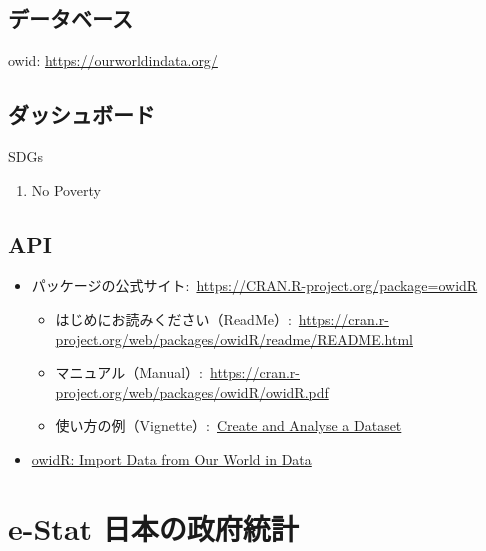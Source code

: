 \documentclass[
  xelatex, ja=standard]{bxjsbook}
\providecommand{\tightlist}{%
  \setlength{\itemsep}{0pt}\setlength{\parskip}{0pt}}
\theoremstyle{definition}
\theoremstyle{definition}
\theoremstyle{definition}
\theoremstyle{definition}
\theoremstyle{remark}
\begin{document}
\hypertarget{ux30c7ux30fcux30bfux30d9ux30fcux30b9-3}{%
\section{データベース}\label{ux30c7ux30fcux30bfux30d9ux30fcux30b9-3}}

owid: \url{https://ourworldindata.org/}

\hypertarget{ux30c0ux30c3ux30b7ux30e5ux30dcux30fcux30c9-3}{%
\section{ダッシュボード}\label{ux30c0ux30c3ux30b7ux30e5ux30dcux30fcux30c9-3}}

SDGs

\begin{enumerate}
\def\labelenumi{\arabic{enumi}.}
\tightlist
\item
  No Poverty
\end{enumerate}

\hypertarget{api-3}{%
\section{API}\label{api-3}}

\begin{itemize}
\item
  パッケージの公式サイト:~\href{https://cran.r-project.org/package=owidR}{https://CRAN.R-project.org/package=owidR}

  \begin{itemize}
  \item
    はじめにお読みください（ReadMe）:~\url{https://cran.r-project.org/web/packages/owidR/readme/README.html}
  \item
    マニュアル（Manual）:~\url{https://cran.r-project.org/web/packages/owidR/owidR.pdf}
  \item
    使い方の例（Vignette）:~\href{https://cran.r-project.org/web/packages/owidR/vignettes/example-analysis.html}{Create and Analyse a Dataset}
  \end{itemize}
\item
  \href{https://rdrr.io/cran/owidR/}{owidR: Import Data from Our World in Data}
\end{itemize}

\hypertarget{estat-site}{%
\chapter{e-Stat 日本の政府統計}\label{estat-site}}
\end{document}
